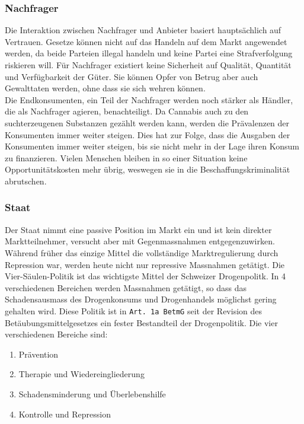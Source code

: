 \documentclass[../main.tex]{subfiles}
\begin{document}
	
	\subsubsection{Nachfrager}
	Die Interaktion zwischen Nachfrager und Anbieter basiert hauptsächlich auf Vertrauen.
	Gesetze können nicht auf das Handeln auf dem Markt angewendet werden, da beide Parteien illegal handeln und keine Partei eine Strafverfolgung riskieren will.
	Für Nachfrager existiert keine Sicherheit auf Qualität, Quantität und Verfügbarkeit der Güter.
	Sie können Opfer von Betrug aber auch Gewalttaten werden, ohne dass sie sich wehren können.\\
	
	\noindent	
	Die Endkonsumenten, ein Teil der Nachfrager werden noch stärker als Händler, die als Nachfrager agieren, benachteiligt.
	Da Cannabis auch zu den suchterzeugenen Substanzen gezählt werden kann, werden die Prävalenzen der Konsumenten immer weiter steigen.
	Dies hat zur Folge, dass die Ausgaben der Konsumenten immer weiter steigen, bis sie nicht mehr in der Lage ihren Konsum zu finanzieren.
	Vielen Menschen bleiben in so einer Situation keine Opportunitätskosten mehr übrig, weswegen sie in die Beschaffungskriminalität abrutschen.
	
	
	\subsubsection{Staat}
	Der Staat nimmt eine passive Position im Markt ein und ist kein direkter Marktteilnehmer, versucht aber mit Gegenmassnahmen entgegenzuwirken.
	Während früher das einzige Mittel die vollständige Marktregulierung durch Repression war, werden heute nicht nur repressive Massnahmen getätigt.
	Die Vier-Säulen-Politik ist das wichtigste Mittel der Schweizer Drogenpolitk. 
	In 4 verschiedenen Bereichen werden Massnahmen getätigt, so dass das Schadensausmass des Drogenkonsums und Drogenhandels möglichst gering gehalten wird.
	Diese Politik ist in \texttt{Art. 1a BetmG} seit der Revision des Betäubungsmittelgesetzes ein fester Bestandteil der Drogenpolitik.
	Die vier verschiedenen Bereiche sind:
	\begin{singlespacing}
	\begin{enumerate}
		\item Prävention
		\item Therapie und Wiedereingliederung
		\item Schadensminderung und Überlebenshilfe
		\item Kontrolle und Repression
	\end{enumerate}
	\end{singlespacing}    
    
\end{document}
